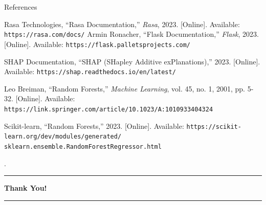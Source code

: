 \documentclass{beamer}
\begin{document}
\begin{frame}[t]{References}
\begin{thebibliography}{9}

Rasa Technologies, ``Rasa Documentation,'' \textit{Rasa}, 2023. [Online]. Available: \texttt{https://rasa.com/docs/}
Armin Ronacher, ``Flask Documentation,'' \textit{Flask}, 2023. [Online]. Available: \texttt{https://flask.palletsprojects.com/}


SHAP Documentation, ``SHAP (SHapley Additive exPlanations),'' 2023. [Online]. Available: \texttt{https://shap.readthedocs.io/en/latest/}

Leo Breiman, ``Random Forests,'' \textit{Machine Learning}, vol. 45, no. 1, 2001, pp. 5-32. [Online]. Available: \texttt{https://link.springer.com/article/10.1023/A:1010933404324}

Scikit-learn, ``Random Forests,'' 2023. [Online]. Available: \texttt{https://scikit-learn.org/dev/modules/generated/\\sklearn.ensemble.RandomForestRegressor.html}



\end{thebibliography}
\end{frame}



\begin{frame}[t]{.}
    \centering
    \vspace{1cm}
    \textbf{\Huge{}}
    
    \vspace{0.5cm}
    \rule{0.5\textwidth}{0.5mm} %

    \vspace{1cm}
    \textbf{\Large{Thank You!}}

    \vspace{0.5cm}
    \rule{0.5\textwidth}{0.5mm} %
\end{frame}
\end{document}
